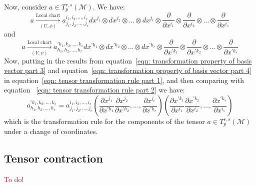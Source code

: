         Now, consider $a \in T^{r,s}_p(\mathcal{M})$. We have: 
        \begin{equation}
          \label{eqn: tensor transformation rule part 1}
          a \xrightarrow[(U,\phi)]{\text{Local chart}}
          a^{i_1,i_2,...,i_s}_{j_1,j_2,...,j_r} dx^{j_1}\otimes dx^{j_2}
          \otimes ...\otimes dx^{j_r} \otimes \frac{\partial}{\partial
          x^{i_1}} \otimes \frac{\partial}{\partial x^{i_2}} \otimes ...
          \otimes \frac{\partial}{\partial x^{i_s}}
        \end{equation}
        and 
        \begin{equation}
          \label{eqn: tensor transformation rule part 2}
          a \xrightarrow[(V,\psi)]{\text{Local chart}}
          a^{\prime k_1,k_2,...,k_s}_{h_1,h_2,...,h_r} dx^{\prime h_1}\otimes dx^{\prime h_2}
          \otimes ...\otimes dx^{\prime h_r} \otimes \frac{\partial}{\partial
          x^{\prime k_1}} \otimes \frac{\partial}{\partial x^{\prime k_2}} \otimes ...
          \otimes \frac{\partial}{\partial x^{\prime k_s}}
        \end{equation}
        Now, putting in the results from equation~\ref{eqn: transformation
        property of basis vector part 3} and equation~\ref{eqn:
        transformation property of basis vector part 4} in equation~\ref{eqn:
        tensor transformation rule part 1}, and then comparing with equation~
        \ref{eqn: tensor transformation rule part 2} we have:
        \begin{equation}
          a^{\prime k_1,k_2,...,k_s}_{h_1,h_2,...,h_r} =
          a^{i_1,i_2,...,i_s}_{j_1,j_2,...,j_r} \left(\frac{\partial
          x^{j_1}}{\partial x^{\prime h_1}} \frac{\partial x^{j_2}}{\partial
          x^{\prime h_2}},..., \frac{\partial x^{j_r}}{\partial x^{\prime
          h_r}} \right) \left(\frac{\partial x^{\prime k_1}}{\partial x^{i_1}}
          \frac{\partial x^{\prime k_2}}{\partial x^{i_2}} ,...,
          \frac{\partial x^{\prime k_s}}{\partial x^{i_s}}\right)
        \end{equation}
        which is the transformation rule for the components of the tensor
        $a\in T^{r,s}_p(\mathcal{M})$ under a change of coordinates.
      \subsection{Tensor contraction}
        \textcolor{red}{To do!}
      
